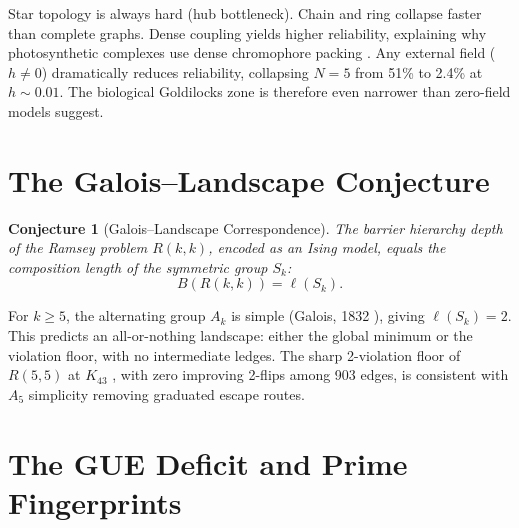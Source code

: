 \documentclass[11pt]{amsart}
\newtheorem{conjecture}[theorem]{Conjecture}
\theoremstyle{definition}
\begin{document}
Star topology is always hard (hub bottleneck). Chain and ring collapse faster than complete graphs. Dense coupling yields higher reliability, explaining why photosynthetic complexes use dense chromophore packing \cite{adolphs2006}. Any external field ($h \neq 0$) dramatically reduces reliability, collapsing $N = 5$ from 51\% to 2.4\% at $h \sim 0.01$. The biological Goldilocks zone is therefore even narrower than zero-field models suggest.


\section{The Galois--Landscape Conjecture}
\label{sec:galois}

\begin{conjecture}[Galois--Landscape Correspondence]\label{conj:galois}
The barrier hierarchy depth of the Ramsey problem $R(k,k)$, encoded as an Ising model, equals the composition length of the symmetric group $S_k$:
\begin{equation}
B(R(k,k)) = \ell(S_k).
\end{equation}
\end{conjecture}

For $k \geq 5$, the alternating group $A_k$ is simple (Galois, 1832 \cite{galois1832}), giving $\ell(S_k) = 2$. This predicts an all-or-nothing landscape: either the global minimum or the violation floor, with no intermediate ledges. The sharp 2-violation floor of $R(5,5)$ at $K_{43}$ \cite{novel2026}, with zero improving 2-flips among 903 edges, is consistent with $A_5$ simplicity removing graduated escape routes.


\section{The GUE Deficit and Prime Fingerprints}
\label{sec:gue}
\end{document}
